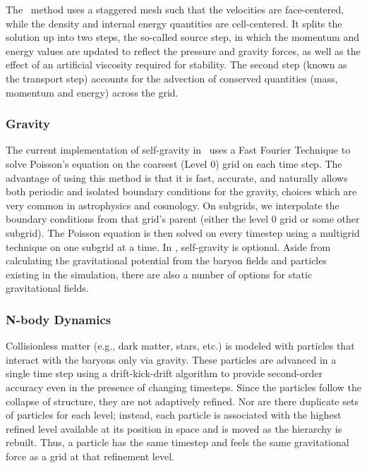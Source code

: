 The \zeus\ method uses a staggered mesh such that the velocities are
face-centered, while the density and internal energy quantities are
cell-centered.  It splits the solution up into two steps, the
so-called source step, in which the momentum and energy values are
updated to reflect the pressure and gravity forces, as well as the
effect of an artificial viscosity required for stability.  The second
step (known as the transport step) accounts for the advection of
conserved quantities (mass, momentum and energy) across the grid.

\subsubsection{Gravity}

The current implementation of self-gravity in \enzo\ uses a Fast
Fourier Technique \citep{Hockney88} to solve Poisson's equation on the
coarsest (Level 0) grid on each time step.  The advantage of using
this method is that it is fast, accurate, and naturally allows both
periodic and isolated boundary conditions for the gravity, choices
which are very common in astrophysics and cosmology.  On subgrids, we
interpolate the boundary conditions from that grid's parent (either
the level 0 grid or some other subgrid).  The Poisson equation is then
solved on every timestep using a multigrid technique on one subgrid at
a time.  In \enzo, self-gravity is optional.  Aside from calculating
the gravitational potential from the baryon fields and particles
existing in the simulation, there are also a number of options for
static gravitational fields.

\subsubsection{N-body Dynamics}

Collisionless matter (e.g., dark matter, stars, etc.) is modeled with
particles that interact with the baryons only via gravity.  These
particles are advanced in a single time step using a drift-kick-drift
algorithm \citep{Hockney88} to provide second-order accuracy even in
the presence of changing timesteps.  Since the particles follow the
collapse of structure, they are not adaptively refined.  Nor are there
duplicate sets of particles for each level; instead, each particle is
associated with the highest refined level available at its position in
space and is moved as the hierarchy is rebuilt.  Thus, a particle has
the same timestep and feels the same gravitational force as a grid at
that refinement level.

